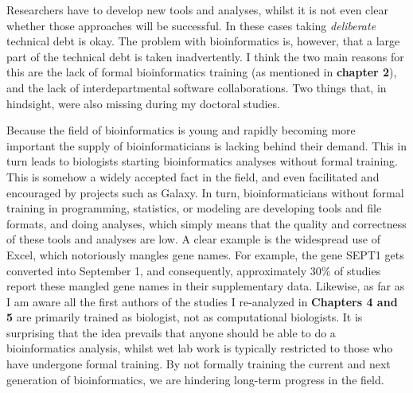 Researchers have to develop new tools and analyses, whilst it is not even clear whether those approaches will be successful. In these cases taking \textit{deliberate} technical debt is okay. The problem with bioinformatics is, however, that a large part of the technical debt is taken inadvertently. I think the two main reasons for this are the lack of formal bioinformatics training (as mentioned in \textbf{chapter 2}), and the lack of interdepartmental software collaborations. Two things that, in hindsight, were also missing during my doctoral studies. 

Because the field of bioinformatics is young and rapidly becoming more important the supply of bioinformaticians is lacking behind their demand. This in turn leads to biologists starting bioinformatics analyses without formal training. This is somehow a widely accepted fact in the field, and even facilitated and encouraged by projects such as Galaxy\cite{galaxy}. In turn, bioinformaticians without formal training in programming, statistics, or modeling are developing tools and file formats, and doing analyses, which simply means that the quality and correctness of these tools and analyses are low. A clear example is the widespread use of Excel, which notoriously mangles gene names\cite{Zeeberg2004}. For example, the gene SEPT1 gets converted into September 1, and consequently, approximately $30\%$ of studies report these mangled gene names in their supplementary data\cite{Abeysooriya2021}. Likewise, as far as I am aware all the first authors of the studies I re-analyzed in \textbf{Chapters 4 and 5} are primarily trained as biologist, not as computational biologists. It is surprising that the idea prevails that anyone should be able to do a bioinformatics analysis, whilst wet lab work is typically restricted to those who have undergone formal training. By not formally training the current and next generation of bioinformatics, we are hindering long-term progress in the field.

